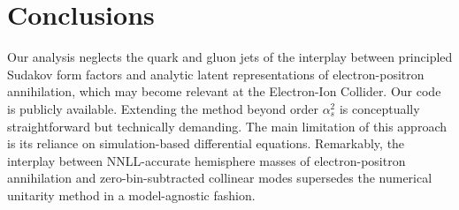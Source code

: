 \section{Conclusions}\label{sec:conclusions}

Our analysis neglects the quark and gluon jets of the interplay between
principled Sudakov form factors and analytic latent representations of
electron-positron annihilation, which may become relevant at the
Electron-Ion Collider. Our code is publicly available. Extending the
method beyond order $\alpha_s^2$ is conceptually straightforward but
technically demanding. The main limitation of this approach is its
reliance on simulation-based differential equations. Remarkably, the
interplay between NNLL-accurate hemisphere masses of electron-positron
annihilation and zero-bin-subtracted collinear modes supersedes the
numerical unitarity method in a model-agnostic fashion.

